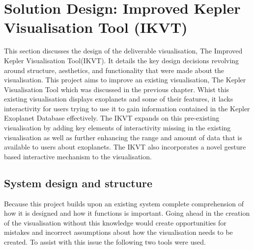 \chapter{Solution Design: Improved Kepler Visualisation Tool (IKVT)}\label{C:sd}
This section discusses the design of the deliverable visualisation, The Improved
Kepler Visualisation Tool(IKVT). It details
the key design decisions revolving around structure, aesthetics, and
functionality that were made about the visualisation. 
This project aims to improve an existing visualisation, The Kepler Visualisation
Tool which was discussed in the previous chapter. Whist this existing
visualisation displays exoplanets and some of their features, it lacks
interactivity for users trying to use it to gain information contained in the
Kepler Exoplanet Database effectively. The IKVT expands on this pre-existing
visualisation by adding key elements of interactivity missing in the existing
 visualisation as well as further enhancing the range and amount of data that
is available to users about exoplanets. The IKVT also incorporates a novel
gesture based interactive mechanism to the visualisation.

\section{System design and structure}
Because this project builds upon an existing system complete comprehension of
how it is designed and how it functions is important. Going ahead in the
creation of the visualisation without this knowledge would create opportunities
for mistakes and incorrect assumptions about how the visualisation needs to be
created. To assist with this issue the following two tools were used.

